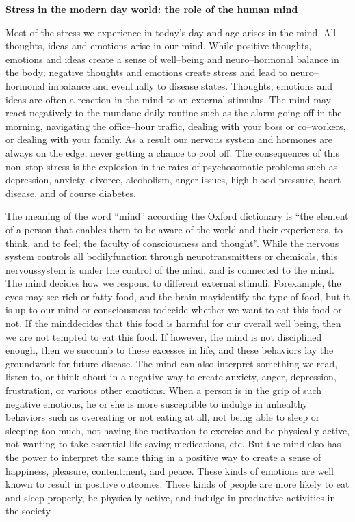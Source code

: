 \noindent\textbf{Stress in the modern day world: the role of the human mind}

Most of the stress we experience in today’s day and age arises in the mind. All thoughts, ideas and emotions arise in our mind. While positive thoughts, emotions and ideas create a sense of well–being and neuro–hormonal balance in the body; negative thoughts and emotions create stress and lead to neuro–hormonal imbalance and eventually to disease states. Thoughts, emotions and ideas are often a reaction in the mind to an external stimulus. The mind may react negatively to the mundane daily routine such as the alarm going off in the morning, navigating the office–hour traffic, dealing with your boss or co–workers, or dealing with your family. As a result our nervous system and hormones are always on the edge, never getting a chance to cool off. The consequences of this non–stop stress is the explosion in the rates of psychosomatic problems such as depression, anxiety, divorce, alcoholism, anger issues, high blood pressure, heart disease, and of course diabetes.

The meaning of the word “mind” according the Oxford dictionary is “the element of a person that enables them to be aware of the world and their experiences, to think, and to feel; the faculty of consciousness and thought”. While the nervous system controls all bodily\break function through neurotransmitters or chemicals, this nervous\break system is under the control of the mind, and is connected to the mind. The mind decides how we respond to different external stimuli. For\break example, the eyes may see rich or fatty food, and the brain may\break identify the type of food, but it is up to our mind or consciousness to\break decide whether we want to eat this food or not. If the mind\break decides that this food is harmful for our overall well being, then we are not tempted to eat this food. If however, the mind is not disciplined enough, then we succumb to these excesses in life, and these behaviors lay the groundwork for future disease. The mind can also interpret something we read, listen to, or think about in a negative way to create anxiety, anger, depression, frustration, or various other emotions. When a person is in the grip of such negative emotions, he or she is more susceptible to indulge in unhealthy behaviors such as overeating or not eating at all, not being able to sleep or sleeping too much, not having the motivation to exercise and be physically active, not wanting to take essential life saving medications, etc. But the mind also has the power to interpret the same thing in a positive way to create a sense of happiness, pleasure, contentment, and peace. These kinds of emotions are well known to result in positive outcomes. These kinds of people are more likely to eat and sleep properly, be physically active, and indulge in productive activities in the society.

